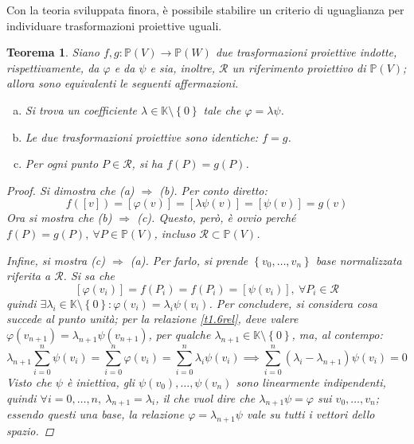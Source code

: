 \documentclass[12pt]{scrartcl}
\theoremstyle{style}
\newtheorem{teorema}{Teorema}[section]
\numberwithin{equation}{subsection}
\begin{document}
\noindent Con la teoria sviluppata finora, \`e possibile stabilire un criterio di uguaglianza per individuare trasformazioni proiettive uguali.
\begin{teorema}\label{tpequiv}
	Siano $f,g  : \mathbb{P}(V) \to \mathbb{P}(W)$ due trasformazioni proiettive indotte, rispettivamente, da $\varphi $ e da $\psi $ e sia, inoltre, $\mathcal{R}  $ un riferimento proiettivo di $\mathbb{P}(V)$; allora sono equivalenti le seguenti affermazioni.
	\begin{enumerate}[(a).]
		\item Si trova un coefficiente $ \lambda \in \mathbb{K} \setminus\left\{ 0 \right\} $ tale che $\varphi  = \lambda \psi $.
		\item Le due trasformazioni proiettive sono identiche: $f = g$.
		\item Per ogni punto $P \in \mathcal{R} $, si ha $f(P) = g(P)$.
	\end{enumerate}
	\begin{proof}
		Si dimostra che (a) $\Rightarrow $ (b). 
		Per conto diretto:
		\[
			f([v]) =[\varphi (v)] = [\lambda \psi (v)]=[\psi (v)] = g(v)
		\] 
		Ora si mostra che (b) $\Rightarrow $ (c).
Questo, per\`o, \`e ovvio perch\'e $ f(P) = g(P), \ \forall P \in \mathbb{P}(V)$, incluso $\mathcal{R} \subset \mathbb{P}(V)$.

Infine, si mostra (c) $\Rightarrow $ (a).
Per farlo, si prende $\left\{ v_0,\ldots,v_n \right\} $ base normalizzata riferita a $\mathcal{R} $. 
Si sa che
\begin{equation}\label{t1.6rel}
	[\varphi (v_i)]=f(P_i)=f(P_i)=[\psi (v_i)], \ \forall P_i \in \mathcal{R} 
\end{equation}
quindi $\exists \lambda _i \in \mathbb{K}\setminus\left\{ 0 \right\} : \varphi (v_i) = \lambda _i \psi (v_i)$.
Per concludere, si considera cosa succede al punto unit\`a; per la relazione \ref{t1.6rel}, deve valere $\varphi (v_{n+1} )= \lambda _{n+1} \psi (v_{n+1} )$, per qualche $\lambda _{n+1} \in \mathbb{K}\setminus\left\{ 0 \right\} $, ma, al contempo:
\[
		\lambda _{n+1} \sum_{i=0}^{n} \psi (v_i) = \sum_{i=0}^{n} \varphi (v_i)= \sum_{i=0}^{n} \lambda _i\psi (v_i)\implies \sum_{i=0}^{n} (\lambda _i - \lambda _{n+1} ) \psi (v_i) = 0
\] 
Visto che $\psi $ \`e iniettiva, gli $\psi (v_0),\ldots,\psi (v_n)$ sono linearmente indipendenti, quindi $\forall i = 0,\ldots,n , \ \lambda _{n+1} = \lambda _i$, il che vuol dire che $\lambda _{n+1} \psi = \varphi $ sui $v_0,\ldots,v_n$; essendo questi una base, la relazione $\varphi  = \lambda _{n+1} \psi $ vale su tutti i vettori dello spazio.
	\end{proof}
\end{teorema}
\end{document}
